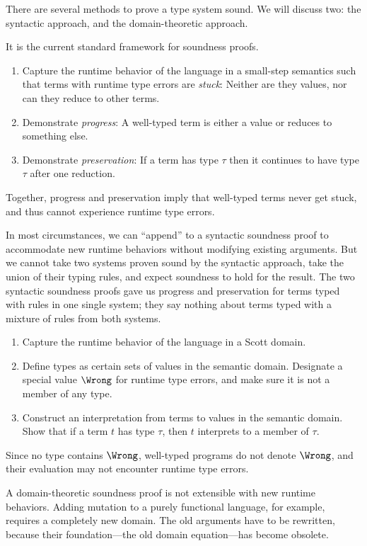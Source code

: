 \documentclass{amsart}
\theoremstyle{definition}
\begin{document}
There are several methods to prove a type system sound. We will
discuss two: the syntactic approach, and the domain-theoretic
approach.


It is the current standard framework for soundness proofs.
\begin{enumerate}
\item Capture the runtime behavior of the language in a
small-step semantics such that terms with runtime type errors are
\emph{stuck}: Neither are they values, nor can they reduce to
other terms.
\item Demonstrate \emph{progress}: A well-typed term is either a
value or reduces to something else.
\item Demonstrate \emph{preservation}: If a term has type $\tau$
then it continues to have type $\tau$ after one reduction.
\end{enumerate}
Together, progress and preservation imply that well-typed terms
never get stuck, and thus cannot experience runtime type errors.

In most circumstances, we can ``append'' to a syntactic soundness
proof to accommodate new runtime behaviors without modifying
existing arguments. But we cannot take two systems proven sound
by the syntactic approach, take the union of their typing rules,
and expect soundness to hold for the result. The two syntactic
soundness proofs gave us progress and preservation for terms
typed with rules in one single system; they say nothing about
terms typed with a mixture of rules from both systems.


\begin{enumerate}
\item Capture the runtime behavior of the language in a Scott
domain.
\item Define types as certain sets of values in the semantic
domain. Designate a special value $\Wrong$ for runtime type
errors, and make sure it is not a member of any type.
\item Construct an interpretation from terms to values in the
semantic domain. Show that if a term $t$ has type $\tau$, then
$t$ interprets to a member of $\tau$.
\end{enumerate}
Since no type contains $\Wrong$, well-typed programs do not
denote $\Wrong$, and their evaluation may not encounter runtime
type errors.

A domain-theoretic soundness proof is not extensible with new
runtime behaviors. Adding mutation to a purely functional
language, for example, requires a completely new domain. The old
arguments have to be rewritten, because their foundation---the
old domain equation---has become obsolete.
\end{document}
